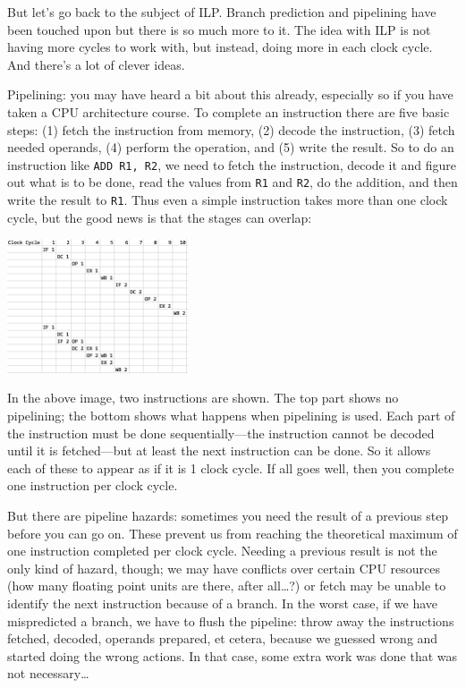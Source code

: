 \documentclass[a4paper]{report}
\begin{document}
But let's go back to the subject of ILP. Branch prediction and pipelining have been touched upon but there is so much more to it. The idea with ILP is not having more cycles to work with, but instead, doing more in each clock cycle. And there's a lot of clever ideas. 

Pipelining: you may have heard a bit about this already, especially so if you have taken a CPU architecture course. To complete an instruction there are five basic steps: (1) fetch the instruction from memory, (2) decode the instruction, (3) fetch needed operands, (4) perform the operation, and (5) write the result. So to do an instruction like \texttt{ADD R1, R2}, we need to fetch the instruction, decode it and figure out what is to be done, read the values from \texttt{R1} and \texttt{R2}, do the addition, and then write the result to \texttt{R1}. Thus even a simple instruction takes more than one clock cycle, but the good news is that the stages can overlap:

\begin{center}
\includegraphics[width=0.4\textwidth]{images/pipelining}
\end{center}

In the above image, two instructions are shown. The top part shows no pipelining; the bottom shows what happens when pipelining is used. Each part of the instruction must be done sequentially---the instruction cannot be decoded until it is fetched---but at least the next instruction can be done. So it allows each of these to appear as if it is 1 clock cycle. If all goes well, then you complete one instruction per clock cycle. 

But there are pipeline hazards: sometimes you need the result of a previous step before you can go on. These prevent us from reaching the theoretical maximum of one instruction completed per clock cycle. Needing a previous result is not the only kind of hazard, though; we may have conflicts over certain CPU resources (how many floating point units are there, after all\ldots?) or fetch may be unable to identify the next instruction because of a branch. In the worst case, if we have mispredicted a branch, we have to flush the pipeline: throw away the instructions fetched, decoded, operands prepared, et cetera, because we guessed wrong and started doing the wrong actions. In that case, some extra work was done that was not necessary\ldots
\end{document}
